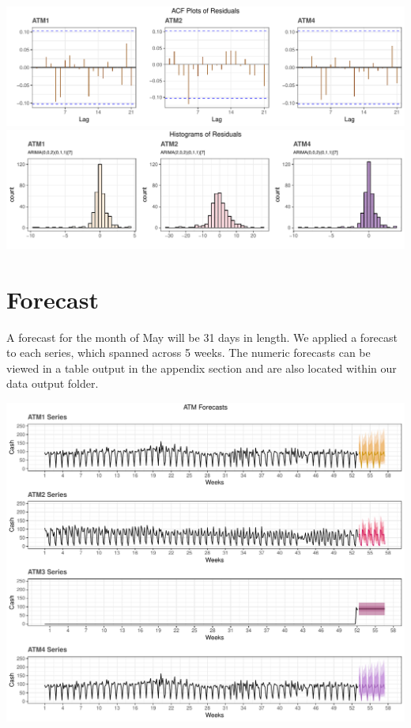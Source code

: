 \documentclass[openany]{book}
\begin{document}
\includegraphics{Group2_Project1_Fall2019_files/figure-latex/unnamed-chunk-6-1.pdf}
\includegraphics{Group2_Project1_Fall2019_files/figure-latex/unnamed-chunk-6-2.pdf}

\hypertarget{forecast}{%
\section{Forecast}\label{forecast}}

A forecast for the month of May will be 31 days in length. We applied a
forecast to each series, which spanned across 5 weeks. The numeric
forecasts can be viewed in a table output in the appendix section and
are also located within our data output folder.

\includegraphics{Group2_Project1_Fall2019_files/figure-latex/unnamed-chunk-7-1.pdf}
\end{document}
